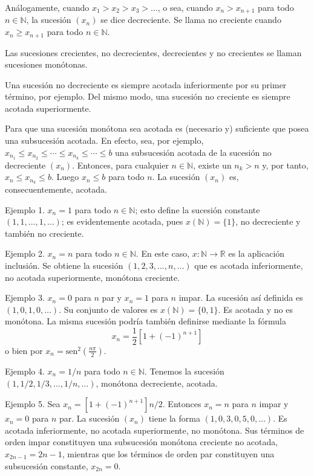 \documentclass[12pt,oneside]{book}
\begin{document}
Análogamente, cuando \(x_1 > x_2 > x_3 > \ldots\), o sea, cuando \(x_n > x_{n+1}\) para todo \(n \in \mathbb{N}\), la sucesión \((x_n)\) se dice decreciente. Se llama no creciente cuando \(x_n \geq x_{n+1}\) para todo \(n \in \mathbb{N}\).

Las sucesiones crecientes, no decrecientes, decrecientes y no crecientes se llaman sucesiones monótonas.

Una sucesión no decreciente es siempre acotada inferiormente por su primer término, por ejemplo. Del mismo modo, una sucesión no creciente es siempre acotada superiormente.

Para que una sucesión monótona sea acotada es (necesario y) suficiente que posea una subsucesión acotada. En efecto, sea, por ejemplo, \(x_{n_1} \leq x_{n_2} \leq \cdots \leq x_{n_k} \leq \cdots \leq b\) una subsucesión acotada de la sucesión no decreciente \((x_n)\). Entonces, para cualquier \(n \in \mathbb{N}\), existe un \(n_k > n\) y, por tanto, \(x_n \leq x_{n_k} \leq b\). Luego \(x_n \leq b\) para todo \(n\). La sucesión \((x_n)\) es, consecuentemente, acotada.

Ejemplo 1. \(x_n = 1\) para todo \(n \in \mathbb{N}\); esto define la sucesión constante \((1, 1, \dots, 1, \dots)\); es evidentemente acotada, pues \(x(\mathbb{N}) = \{1\}\), no decreciente y también no creciente.

Ejemplo 2. \(x_n = n\) para todo \(n \in \mathbb{N}\). En este caso, \(x: \mathbb{N} \to \mathbb{R}\) es la aplicación inclusión. Se obtiene la sucesión \((1, 2, 3, \dots, n, \dots)\) que es acotada inferiormente, no acotada superiormente, monótona creciente.

Ejemplo 3. \(x_n = 0\) para \(n\) par y \(x_n = 1\) para \(n\) impar. La sucesión así definida es \((1, 0, 1, 0, \dots)\). Su conjunto de valores es \(x(\mathbb{N}) = \{0, 1\}\). Es acotada y no es monótona. La misma sucesión podría también definirse mediante la fórmula
\[x_n = \frac{1}{2}[1 + (-1)^{n+1}]\] o bien por \(x_n = \text{sen}^2\left(\frac{n\pi}{2}\right)\).

Ejemplo 4. \(x_n = 1/n\) para todo \(n \in \mathbb{N}\). Tenemos la sucesión \((1, 1/2, 1/3, \dots, 1/n, \dots)\), monótona decreciente, acotada.

Ejemplo 5. Sea \(x_n = [1 + (-1)^{n+1}]n/2\). Entonces \(x_n = n\) para \(n\) impar y \(x_n = 0\) para \(n\) par. La sucesión \((x_n)\) tiene la forma \((1, 0, 3, 0, 5, 0, \dots)\). Es acotada inferiormente, no acotada superiormente, no monótona. Sus términos de orden impar constituyen una subsucesión monótona creciente no acotada, \(x_{2n-1} = 2n - 1\), mientras que los términos de orden par constituyen una subsucesión constante, \(x_{2n} = 0\).
\end{document}
